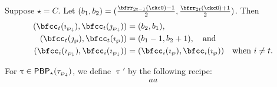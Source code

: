 \documentclass[counting_main.tex]{subfiles}
\begin{document}
Suppose $\star = C$. Let
$(b_{1},b_{2}) = (\frac{\bfrr_{2t-1}(\ckcO)-1}{2},\frac{\bfrr_{2t}(\ckcO)+1}{2})$.
Then
\[
  \begin{split}
    (\bfcc_{t}(\imath_{\PPm}), \bfcc_{t}(\jmath_{\PPm})) &= (b_{2},b_{1}),  \\
    (\bfcc_{t}(\jmath_{\wp}), \bfcc_{t}(\imath_{\wp})) &= (b_{1}-1,b_{2}+1),\AND\\
    (\bfcc_{i}(\imath_{\PPm}),\bfcc_{i}(\imath_{\PPm})) &=(\bfcc_{i}(\imath_{\wp}),\bfcc_{i}(\imath_{\wp}))\quad \text{when
      $i\neq t$}.
  \end{split}
\]

For $\uptau\in \mathsf{PBP}_{\star}(\tau_{\wp_{\downarrow}})$, we define $\uptau'$ by the following recipe:
\begin{align*}
  aa
\end{align*}
\end{document}
